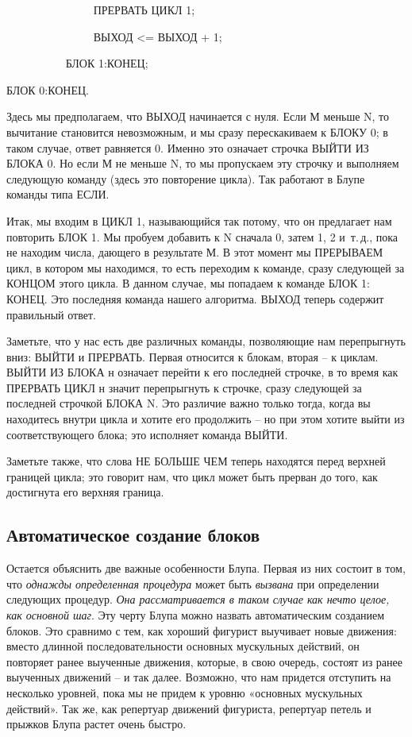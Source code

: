 \documentclass[../main.tex]{subfiles}
\begin{document}
~~~~~~~~~~~~~~~ ПРЕРВАТЬ ЦИКЛ 1;

~~~~~~~~~~~~~~~ ВЫХОД \textless= ВЫХОД + 1;

~~~~~~~~~~ БЛОК 1:КОНЕЦ;

БЛОК 0:КОНЕЦ.

Здесь мы предполагаем, что ВЫХОД начинается с нуля. Если М меньше N, то вычитание становится невозможным, и мы сразу перескакиваем к БЛОКУ 0; в таком случае, ответ равняется 0. Именно это означает строчка ВЫЙТИ ИЗ БЛОКА 0. Но если М не меньше N, то мы пропускаем эту строчку и выполняем следующую команду (здесь это повторение цикла). Так работают в Блупе команды типа ЕСЛИ.

Итак, мы входим в ЦИКЛ 1, называющийся так потому, что он предлагает нам повторить БЛОК 1. Мы пробуем добавить к N сначала 0, затем 1, 2 и~т.\,д., пока не находим числа, дающего в результате М\@. В этот момент мы ПРЕРЫВАЕМ цикл, в котором мы находимся, то есть переходим к команде, сразу следующей за КОНЦОМ этого цикла. В данном случае, мы попадаем к команде БЛОК 1: КОНЕЦ\@. Это последняя команда нашего алгоритма. ВЫХОД теперь содержит правильный ответ.

Заметьте, что у нас есть две различных команды, позволяющие нам перепрыгнуть вниз: ВЫЙТИ и ПРЕРВАТЬ\@. Первая относится к блокам, вторая \--- к циклам. ВЫЙТИ ИЗ БЛОКА н означает перейти к его последней строчке, в то время как ПРЕРВАТЬ ЦИКЛ н значит перепрыгнуть к строчке, сразу следующей за последней строчкой БЛОКА N\@. Это различие важно только тогда, когда вы находитесь внутри цикла и хотите его продолжить \--- но при этом хотите выйти из соответствующего блока; это исполняет команда ВЫЙТИ.

Заметьте также, что слова НЕ БОЛЬШЕ ЧЕМ теперь находятся перед верхней границей цикла; это говорит нам, что цикл может быть прерван до того, как достигнута его верхняя граница.


\subsection{Автоматическое создание блоков}

Остается объяснить две важные особенности Блупа. Первая из них состоит в том, что \emph{однажды определенная процедура} может быть \emph{вызвана} при определении следующих процедур. \emph{Она рассматривается в таком случае как нечто целое, как основной шаг}. Эту черту Блупа можно назвать автоматическим созданием блоков. Это сравнимо с тем, как хороший фигурист выучивает новые движения: вместо длинной последовательности основных мускульных действий, он повторяет ранее выученные движения, которые, в свою очередь, состоят из ранее выученных движений \--- и так далее. Возможно, что нам придется отступить на несколько уровней, пока мы не придем к уровню «основных мускульных действий». Так же, как репертуар движений фигуриста, репертуар петель и прыжков Блупа растет очень быстро.
\end{document}
